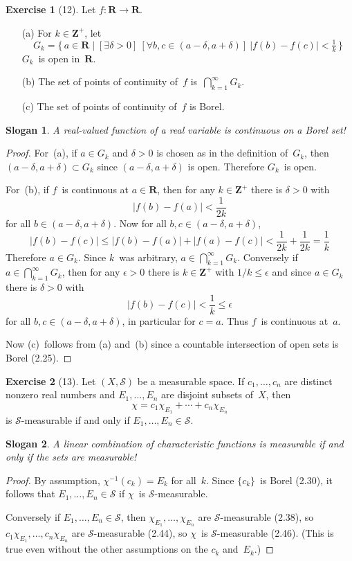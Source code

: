 \documentclass[letterpaper,12pt]{article}
\newcommand{\Z}{\mathbf{Z}}
\newcommand{\Zp}{\Z^+}
\newcommand{\R}{\mathbf{R}}
\renewcommand{\S}{\mathcal{S}}
\newcommand{\bigsect}{\bigcap}
\newcommand{\abs}[1]{|#1|}
\newcommand{\inv}[1]{#1^{-1}}
\theoremstyle{definition}
\newtheorem*{exer}{Exercise}
\theoremstyle{remark}
\theoremstyle{plain}
\newtheorem*{slogan}{Slogan}
\begin{document}
\begin{exer}[12]
Let \(f:\R\to\R\).
\begin{enumerate}[itemsep=0pt]
\item[(a)] For \(k\in\Zp\), let
\[G_k=\{\,a\in\R\mid[\exists\delta>0]\ [\forall b,c\in(a-\delta,a+\delta)]\ \abs{f(b)-f(c)}<\tfrac{1}{k}\,\}\]
\(G_k\)~is open in~\(\R\).
\item[(b)] The set of points of continuity of~\(f\) is~\(\bigsect_{k=1}^{\infty}G_k\).
\item[(c)] The set of points of continuity of~\(f\) is Borel.
\end{enumerate}
\end{exer}
\begin{slogan}
A real-valued function of a real variable is continuous on a Borel set!
\end{slogan}
\begin{proof}
For~(a), if \(a\in G_k\) and \(\delta>0\) is chosen as in the definition of~\(G_k\), then \((a-\delta,a+\delta)\subset G_k\) since \((a-\delta,a+\delta)\) is open. Therefore \(G_k\)~is open.

For~(b), if \(f\)~is continuous at \(a\in\R\), then for any \(k\in\Zp\) there is \(\delta>0\) with
\[\abs{f(b)-f(a)}<\frac{1}{2k}\]
for all \(b\in(a-\delta,a+\delta)\). Now for all \(b,c\in(a-\delta,a+\delta)\),
\[\abs{f(b)-f(c)}\le\abs{f(b)-f(a)}+\abs{f(a)-f(c)}<\frac{1}{2k}+\frac{1}{2k}=\frac{1}{k}\]
Therefore \(a\in G_k\). Since \(k\)~was arbitrary, \(a\in\bigsect_{k=1}^{\infty} G_k\). Conversely if \(a\in\bigsect_{k=1}^{\infty} G_k\), then for any \(\epsilon>0\) there is \(k\in\Zp\) with \(1/k\le\epsilon\) and since \(a\in G_k\) there is \(\delta>0\) with
\[\abs{f(b)-f(c)}<\frac{1}{k}\le\epsilon\]
for all \(b,c\in(a-\delta,a+\delta)\), in particular for \(c=a\). Thus \(f\)~is continuous at~\(a\).

Now (c)~follows from (a) and~(b) since a countable intersection of open sets is Borel (2.25).
\end{proof}

\begin{exer}[13]
Let \((X,\S)\) be a measurable space. If \(c_1,\ldots,c_n\) are distinct nonzero real numbers and \(E_1,\ldots,E_n\) are disjoint subsets of~\(X\), then
\[\chi=c_1\chi_{E_1}+\cdots+c_n\chi_{E_n}\]
is \(\S\)-measurable if and only if \(E_1,\ldots,E_n\in\S\).
\end{exer}
\begin{slogan}
A linear combination of characteristic functions is measurable if and only if the sets are measurable!
\end{slogan}
\begin{proof}
By assumption, \(\inv{\chi}(c_k)=E_k\) for all~\(k\). Since \(\{c_k\}\)~is Borel (2.30), it follows that \(E_1,\ldots,E_n\in\S\) if \(\chi\)~is \(\S\)-measurable.

Conversely if \(E_1,\ldots,E_n\in\S\), then \(\chi_{E_1},\ldots,\chi_{E_n}\) are \(\S\)-measurable (2.38), so \(c_1\chi_{E_1},\ldots,c_n\chi_{E_n}\) are \(\S\)-measurable (2.44), so \(\chi\)~is \(\S\)-measurable (2.46). (This is true even without the other assumptions on the \(c_k\) and~\(E_k\).)
\end{proof}
\end{document}
